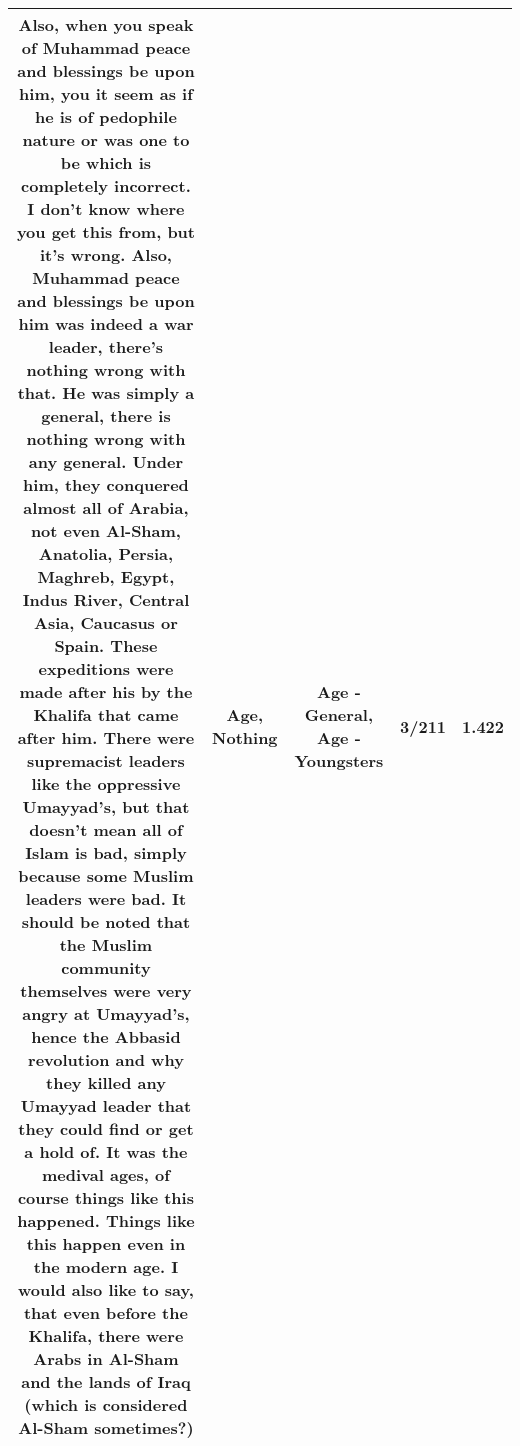 \documentclass[11pt]{article}
\newlength\mylength
\begin{document}
\begin{center}
\begin{longtable}{|C{.65\mylength}|C{.30\mylength}|C{.12\mylength}|C{.12\mylength}|C{.12\mylength}|}
  \small Also, when you speak of Muhammad peace and blessings be upon him, you it seem as if he is of pedophile nature or was one to be which is completely incorrect. I don't know where you get this from, but it's wrong. Also, Muhammad peace and blessings be upon him was indeed a war leader, there's \textbf{nothing} wrong with that. He was simply a general, there is \textbf{nothing} wrong with any general. Under him, they conquered almost all of Arabia, not even Al-Sham, Anatolia, Persia, Maghreb, Egypt, Indus River, Central Asia, Caucasus or Spain. These expeditions were made after his by the Khalifa that came after him. There were supremacist leaders like the oppressive Umayyad's, but that doesn't mean all of Islam is bad, simply because some Muslim leaders were bad. It should be noted that the Muslim community themselves were very angry at Umayyad's, hence the Abbasid revolution and why they killed any Umayyad leader that they could find or get a hold of. It was the medival ages, of course things like this happened. Things like this happen even in the modern \textbf{age}. I would also like to say, that even before the Khalifa, there were Arabs in Al-Sham and the lands of Iraq (which is considered Al-Sham sometimes?)\normalsize   & Age, Nothing & Age - General, Age - Youngsters & 3/211 & 1.422 \\  \hline

\end{longtable}
\end{center}
\end{document}
